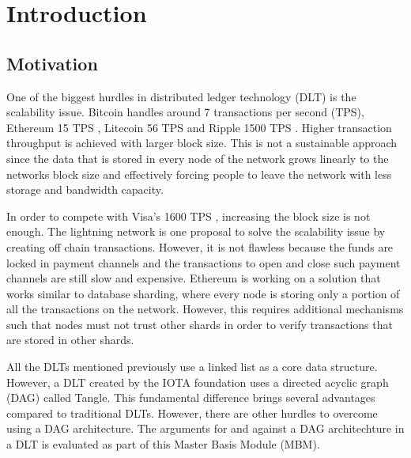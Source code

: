 \chapter{Introduction}

\section{Motivation}
One of the biggest hurdles in distributed ledger technology (DLT) is the scalability issue. Bitcoin handles around 7 transactions per second (TPS), Ethereum 15 TPS \cite{ethereum-scale}, Litecoin 56 TPS and Ripple 1500 TPS \cite{bitcoin-tps}. Higher transaction throughput is achieved with larger block size. This is not a sustainable approach since the data that is stored in every node of the network grows linearly to the networks block size and effectively forcing people to leave the network with less storage and bandwidth capacity. 

In order to compete with Visa's 1600 TPS \cite{visa-tps}, increasing the block size is not enough. The lightning network is one proposal to solve the scalability issue by creating off chain transactions. However, it is not flawless because the funds are locked in payment channels and the transactions to open and close such payment channels are still slow and expensive. Ethereum is working on a solution that works similar to database sharding, where every node is storing only a portion of all the transactions on the network. However, this requires additional mechanisms such that nodes must not trust other shards in order to verify transactions that are stored in other shards.

All the DLTs mentioned previously use a linked list as a core data structure. However, a DLT created by the IOTA foundation uses a directed acyclic graph (DAG) called Tangle. This fundamental difference brings several advantages compared to traditional DLTs. However, there are other hurdles to overcome using a DAG architecture. The arguments for and against a DAG architechture in a DLT is evaluated as part of this Master Basis Module (MBM). 

